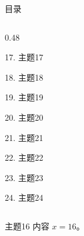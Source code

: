 \documentclass[aspectratio=169,10pt,fontset=fandol]{ctexbeamer}
\begin{document}
\begin{frame}[t,fragile]{目录}
\begin{columns}[T,onlytextwidth]
\begin{column}{0.48\textwidth}
{\color{gray!40}\small 17. 主题17\par}\vspace{0.22em}
{\color{gray!40}\small 18. 主题18\par}\vspace{0.22em}
{\color{gray!40}\small 19. 主题19\par}\vspace{0.22em}
{\color{gray!40}\small 20. 主题20\par}\vspace{0.22em}
{\color{gray!40}\small 21. 主题21\par}\vspace{0.22em}
{\color{gray!40}\small 22. 主题22\par}\vspace{0.22em}
{\color{gray!40}\small 23. 主题23\par}\vspace{0.22em}
{\color{gray!40}\small 24. 主题24\par}\vspace{0.22em}
\end{column}
\end{columns}
\end{frame}
\begin{frame}[t,fragile]{主题16}
\normalsize
{\normalsize
内容 $x=16$。
}
\end{frame}
\end{document}
